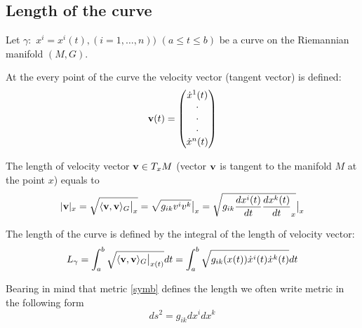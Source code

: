 \documentclass[12pt]{article}
\theoremstyle{theorem}
\numberwithin{equation}{section}
\begin{document}
\subsection {Length of the curve}


Let $\gamma\colon\,\, x^i=x^i(t), (i=1,\dots,n))$
 $(a\leq t\leq b)$ be a curve on the Riemannian manifold $(M,G)$.

  At the every point of the curve the velocity vector (tangent vector)
  is defined:
\begin{equation}\label{velvector}
  {\bf v}(t)=\begin{pmatrix}
       \dot x^1 (t)\\
             \cdot\\
             \cdot\\
             \cdot\\
             \dot x^n(t)
         \end{pmatrix}
\end{equation}

The length of velocity vector ${\bf v}\in T_xM$ (vector ${\bf v}$ is tangent to the manifold $M$ at the point $x$)
equals to
     \begin{equation}\label{speedforaunt}
       |{\bf v}|_x=\sqrt {\langle {\bf v},{\bf v}\rangle_G\big\vert_{x}}=
       \sqrt{g_{ik}v^iv^k}\big\vert_{x}=
       \sqrt{g_{ik}{dx^i(t)\over dt}{dx^k(t)\over dt}_x}\big\vert_{x}
     \end{equation}

  The length of
 the curve is defined by the integral of the length of velocity vector:
\begin{equation}\label{lengthofthecurve}
  L_\gamma=\int_a^b \sqrt {\langle{\bf v},{\bf v}\rangle_G\big\vert_{x(t)}}dt=
  \int_a^b \sqrt {g_{ik}(x(t))\dot x^i(t) \dot x^k(t)}dt
\end{equation}

Bearing in mind that metric \eqref{symb} defines the length
we often write metric in the following form
\begin{equation}\label{metric}
  ds^2=g_{ik}dx^idx^k
\end{equation}

       \bigskip
\end{document}
